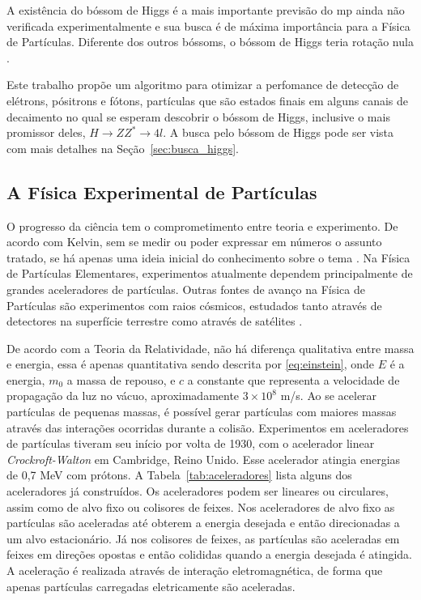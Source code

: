 A existência do bóssom de Higgs é a mais importante previsão do \gls{mp} 
ainda não verificada experimentalmente e sua busca é de máxima importância para
a Física de Partículas. Diferente dos outros bóssoms, o
bóssom de Higgs teria rotação nula \cite{Intro_Nuclear}.

Este trabalho propõe um algoritmo para otimizar a perfomance de detecção de
elétrons, pósitrons e fótons, partículas que são estados finais em alguns canais de
decaimento no qual se esperam descobrir o bóssom de Higgs, inclusive o mais promissor
deles, $H\rightarrow ZZ^*\rightarrow 4l$. 
A busca pelo bóssom de Higgs pode ser vista com mais detalhes na Seção~\ref{sec:busca_higgs}.

\subsection{A Física Experimental de Partículas}
\label{ssec:fisexp}

O progresso da ciência tem o comprometimento entre teoria e experimento. De
acordo com Kelvin, sem se medir ou poder expressar em números o assunto tratado, 
se há apenas uma ideia inicial do conhecimento sobre o tema \cite{kelvin}. 
Na Física de Partículas Elementares, experimentos atualmente dependem
principalmente de grandes aceleradores de partículas. Outras fontes de avanço na
Física de Partículas são experimentos com raios cósmicos, estudados tanto
através de detectores na superfície terrestre como através de satélites 
\cite{nature_space_and_time}. 

De acordo com a Teoria da Relatividade, não há diferença qualitativa entre
massa e energia, essa é apenas quantitativa \cite{einstein} sendo descrita por
\ref{eq:einstein}, onde $E$ é a energia, $m_0$ a massa de repouso, e $c$ a constante que representa a
velocidade de propagação da luz no vácuo, aproximadamente $3\times10^{8}$ m/s. Ao se acelerar
partículas de pequenas massas, é possível gerar partículas com maiores massas
através das interações ocorridas durante a colisão. Experimentos em
aceleradores de partículas tiveram seu início por volta de 1930, com o
acelerador linear \emph{Crockroft-Walton} em Cambridge, Reino Unido. Esse
acelerador atingia energias de 0,7 MeV com prótons. A Tabela~\ref{tab:aceleradores} 
lista alguns dos aceleradores já construídos. Os
aceleradores podem ser lineares ou circulares, assim como de alvo fixo ou colisores
de feixes. Nos aceleradores de alvo fixo as partículas são aceleradas até
obterem a energia desejada e então direcionadas a um alvo estacionário. Já nos
colisores de feixes, as partículas são aceleradas em feixes em direções
opostas e então colididas quando a energia desejada é atingida. A aceleração é
realizada através de interação eletromagnética, de forma que apenas
partículas carregadas eletricamente são aceleradas.


